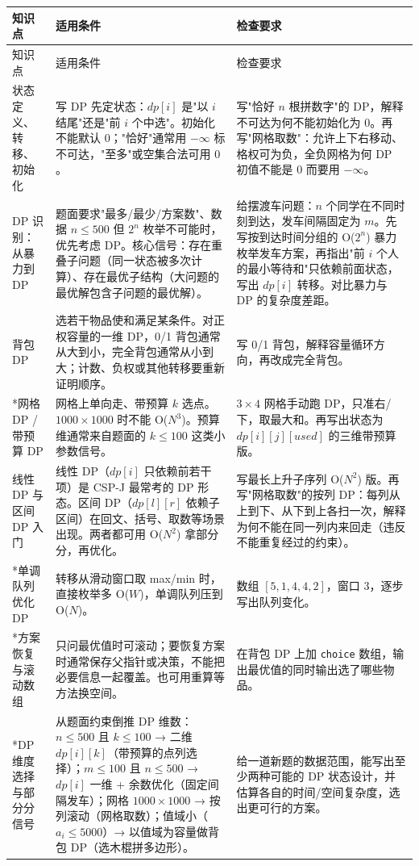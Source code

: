 \documentclass[a4paper,11pt]{article}
\newcommand{\code}[1]{\texttt{#1}}
\begin{document}
\begin{longtable}{L{2.4cm} L{7.5cm} L{6.8cm}}
\toprule
知识点 & 适用条件 & 检查要求 \\
\midrule
\endfirsthead
\toprule
知识点 & 适用条件 & 检查要求 \\
\midrule
\endhead
\endfoot
\bottomrule
\endlastfoot

状态定义、转移、初始化
& 写 DP 先定状态：$dp[i]$ 是"以 $i$ 结尾"还是"前 $i$ 个中选"。初始化不能默认 $0$；"恰好"通常用 $-\infty$ 标不可达，"至多"或空集合法可用 $0$。
& 写"恰好 $n$ 根拼数字"的 DP，解释不可达为何不能初始化为 $0$。再写"网格取数"：允许上下右移动、格权可为负，全负网格为何 DP 初值不能是 $0$ 而要用 $-\infty$。 \\[2mm]

DP 识别：从暴力到 DP
& 题面要求"最多/最少/方案数"、数据 $n\le500$ 但 $2^n$ 枚举不可能时，优先考虑 DP。核心信号：存在重叠子问题（同一状态被多次计算）、存在最优子结构（大问题的最优解包含子问题的最优解）。
& 给摆渡车问题：$n$ 个同学在不同时刻到达，发车间隔固定为 $m$。先写按到达时间分组的 O($2^n$) 暴力枚举发车方案，再指出"前 $i$ 个人的最小等待和"只依赖前面状态，写出 $dp[i]$ 转移。对比暴力与 DP 的复杂度差距。 \\[2mm]

背包 DP
& 选若干物品使和满足某条件。对正权容量的一维 DP，0/1 背包通常从大到小，完全背包通常从小到大；计数、负权或其他转移要重新证明顺序。
& 写 0/1 背包，解释容量循环方向，再改成完全背包。 \\[2mm]

*网格 DP / 带预算 DP
& 网格上单向走、带预算 $k$ 选点。$1000\times1000$ 时不能 O($N^3$)。预算维通常来自题面的 $k\le100$ 这类小参数信号。
& $3\times4$ 网格手动跑 DP，只准右/下，取最大和。再写出状态为 $dp[i][j][used]$ 的三维带预算版。 \\[2mm]

线性 DP 与区间 DP 入门
& 线性 DP（$dp[i]$ 只依赖前若干项）是 CSP-J 最常考的 DP 形态。区间 DP（$dp[l][r]$ 依赖子区间）在回文、括号、取数等场景出现。两者都可用 O($N^2$) 拿部分分，再优化。
& 写最长上升子序列 O($N^2$) 版。再写"网格取数"的按列 DP：每列从上到下、从下到上各扫一次，解释为何不能在同一列内来回走（违反不能重复经过的约束）。 \\[2mm]

*单调队列优化 DP
& 转移从滑动窗口取 max/min 时，直接枚举多 O($W$)，单调队列压到 O($N$)。
& 数组 $[5,1,4,4,2]$，窗口 $3$，逐步写出队列变化。 \\[2mm]

*方案恢复与滚动数组
& 只问最优值时可滚动；要恢复方案时通常保存父指针或决策，不能把必要信息一起覆盖。也可用重算等方法换空间。
& 在背包 DP 上加 \code{choice} 数组，输出最优值的同时输出选了哪些物品。 \\[2mm]

*DP 维度选择与部分分信号
& 从题面约束倒推 DP 维数：$n\le500$ 且 $k\le100$ → 二维 $dp[i][k]$（带预算的点列选择）；$m\le100$ 且 $n\le500$ → $dp[i]$ 一维 + 余数优化（固定间隔发车）；网格 $1000\times1000$ → 按列滚动（网格取数）；值域小（$a_i\le5000$）→ 以值域为容量做背包 DP（选木棍拼多边形）。
& 给一道新题的数据范围，能写出至少两种可能的 DP 状态设计，并估算各自的时间/空间复杂度，选出更可行的方案。 \\
\end{longtable}
\end{document}
